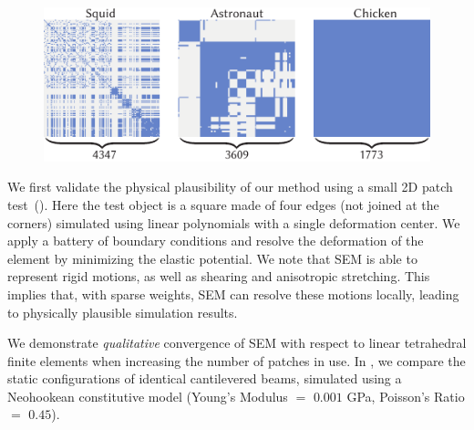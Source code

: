 \begin{figure}[h]
  \includegraphics[width=\columnwidth]{figures/stiffness_sparsity.pdf}
  \caption{}
\end{figure}

We first validate the physical plausibility of our method using a small 2D patch test~(). 
Here the test object is a square made of four edges (not joined at the corners) simulated using linear polynomials with a single deformation center.
We apply a battery of boundary conditions and resolve the deformation of the element by minimizing the elastic potential.
We note that SEM is able to represent rigid motions, as well as shearing and anisotropic stretching. 
This implies that, with sparse weights, SEM can resolve these motions locally, leading to physically plausible simulation results.


We demonstrate \emph{qualitative} convergence of SEM with respect to linear tetrahedral finite elements when increasing the number of patches in use.
In , we compare the static configurations of identical cantilevered beams, simulated using a Neohookean constitutive model (Young's Modulus $=$ $0.001$ GPa, Poisson's Ratio $=$ $0.45$). 

